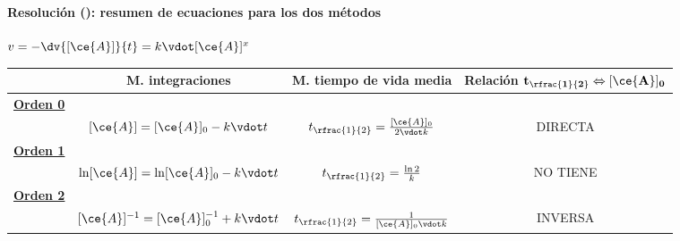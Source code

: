
\begin{frame}
	\frametitle{\ejerciciocmd}
	\framesubtitle{Resolución (): resumen de ecuaciones para los dos métodos}
	\begin{center}
	\end{center}
	 $v = -\dv{[\ce{A}]}{t} = k\vdot[\ce{A}]^x$
	\begin{center}
		\begin{tabular}{lccc}
						&	\textbf{M. integraciones}	&	\textbf{M. tiempo de vida media}	&	\textbf{Relación $\mathbf{t_{\rfrac{1}{2}}\Leftrightarrow[\ce{A}]_0}$}	\\
			\midrule
			\underline{\textbf{\color{blue}Orden 0}}							\\
						&	$[\ce{A}] = [\ce{A}]_0 - k\vdot t$					&
							$t_{\rfrac{1}{2}} = \frac{[\ce{A}]_0}{2\vdot k}$	&
							DIRECTA												\\[.3cm]
			\midrule
			\underline{\textbf{\color{blue}Orden 1}}							\\
						&	$\ln[\ce{A}] = \ln[\ce{A}]_0 - k\vdot t$			&
							$t_{\rfrac{1}{2}} = \frac{\ln 2}{k}$					&
							NO TIENE											\\[.3cm]
			\midrule
			\underline{\textbf{\color{blue}Orden 2}}							\\
						&	$[\ce{A}]^{-1} = [\ce{A}]^{-1}_0 + k\vdot t$		&
						$t_{\rfrac{1}{2}} = \frac{1}{[\ce{A}]_0\vdot k}$		&
						INVERSA
		\end{tabular}
	\end{center}
\end{frame}

